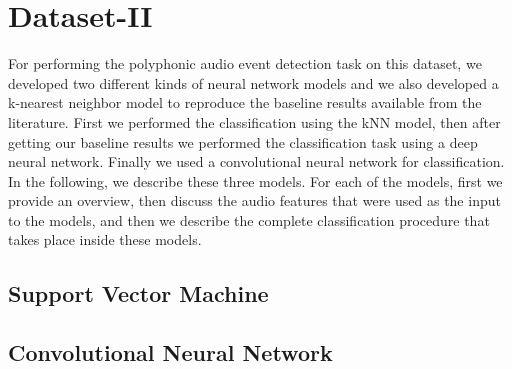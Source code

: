 \section{Dataset-II}
For performing the polyphonic audio event detection task on this dataset, we developed two different kinds of neural network models and we also developed a k-nearest neighbor model to reproduce the baseline results available from the literature. First we performed the classification using the kNN model, then after getting our baseline results we performed the classification task using a deep neural network. Finally we used a convolutional neural network for classification. In the following, we describe these three models. For each of the models, first we provide an overview, then discuss the audio features that were used as the input to the models, and then we describe the complete classification procedure that takes place inside these models.

\subsection{Support Vector Machine}

\subsection{Convolutional Neural Network}
